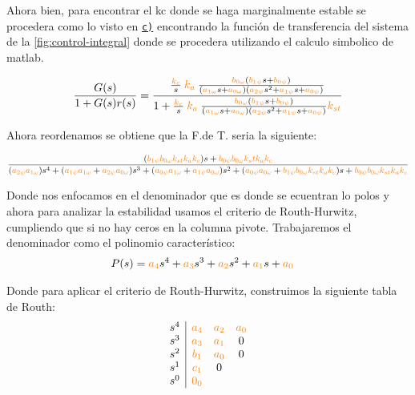 Ahora bien,  para encontrar el kc donde se haga marginalmente estable se procedera como lo visto en \hyperref[pregunta-c]{\texttt{c)}} encontrando la función de transferencia del sistema de la \autoref{fig:control-integral} donde se procedera utilizando el calculo simbolico de matlab. 

\begin{equation}
  \frac{G(s)}{1 + G(s)r(s)} = \dfrac{\frac{\nara{k_c}}{s}\nara{k_a} \frac{\nara{\nara{b_{0\omega}}}\left(\nara{b_{1\psi}}s + \nara{b_{0\psi}}\right)}
  {\left(\nara{a_{1\omega}}s + \nara{a_{0\omega}}\right)\left(\nara{a_{2\psi}}s^{2} + \nara{a_{1\psi}}s + \nara{a_{0\psi}}\right)}}
  {1+\frac{\nara{k_c}}{s} \nara{k_a} \frac{\nara{\nara{b_{0\omega}}}\left(\nara{b_{1\psi}}s + \nara{b_{0\psi}}\right)}
  {\left(\nara{a_{1\omega}}s + \nara{a_{0\omega}}\right)\left(\nara{a_{2\psi}}s^{2} + \nara{a_{1\psi}}s + \nara{a_{0\psi}}\right)}\nara{k_{st}}}
\end{equation}

Ahora reordenamos se obtiene que la F.de T. seria la siguiente:


\begin{equation}
  \dfrac{(\nara{b_{1\psi} b_{0\omega} k_{st} k_a k_c})s + \nara{b_{0\psi} b_{0\omega}k_st k_a k_c}}
  {(\nara{a_{2\psi} a_{1\omega}}) s^4 +
  (\nara{a_{1\psi} a_{1\omega}} + \nara{a_{2\psi} a_{0\omega}}) s^3 + 
  (\nara{a_{0\psi} a_{1\omega}} + \nara{a_{1\psi} a_{0\omega}}) s^2 + 
  (\nara{a_{0\psi} a_{0\omega}} + \nara{b_{1\psi} b_{0\omega}k_{st} k_a k_c})s+ 
  \nara{b_{0\psi} b_{0\omega} k_{st} k_a k_c}}
\end{equation}

Donde nos enfocamos en el denominador que es donde se ecuentran lo polos y ahora para analizar la estabilidad usamos el criterio de Routh-Hurwitz, cumpliendo que si no hay ceros en la columna pivote. Trabajaremos el denominador como el polinomio característico:
\begin{align}
    P(s) = \nara{a_4} s^4 + \nara{a_3} s^3 + \nara{a_2} s^2 + \nara{a_1} s + \nara{a_0} &
\end{align}

Donde para aplicar el criterio de Routh-Hurwitz, construimos la siguiente tabla de Routh:
\[
\begin{array}{c|ccc}
s^4 & \nara{a_4} & \nara{a_2} & \nara{a_0} \\
s^3 & \nara{a_3} & \nara{a_1} & 0\\
s^2 & \nara{b_1} & \nara{a_0} & 0\\
s^1 & \nara{c_1} & 0 \\
s^0 & \nara{0_0} & 
\end{array}
\]



